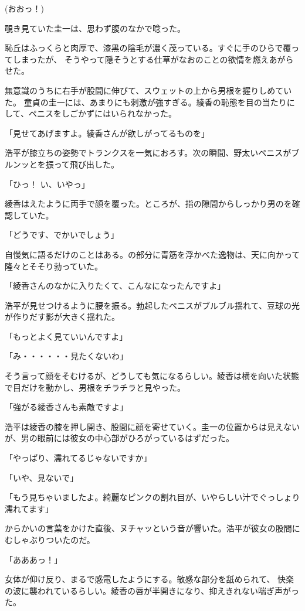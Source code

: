 ﻿\documentclass[book,tate]{jlreq}
\begin{document}
(おおっ！)

覗き見ていた圭一は、思わず腹のなかで唸った。

恥丘はふっくらと肉厚で、漆黒の陰毛が濃く茂っている。すぐに手のひらで覆ってしまったが、
そうやって隠そうとする仕草がなおのことの欲情を燃えあがらせた。

無意識のうちに右手が股間に伸びて、スウェットの上から男根を握りしめていた。
童貞の圭一には、あまりにも刺激が強すぎる。綾香の恥態を目の当たりにして、ペニスをしごかずにはいられなかった。

「見せてあげますよ。綾香さんが欲しがってるものを」

浩平が膝立ちの姿勢でトランクスを一気におろす。次の瞬間、野太いペニスがブルンッとを振って飛び出した。

「ひっ！ い、いやっ」

綾香はえたように両手で顔を覆った。ところが、指の隙間からしっかり男のを確認していた。

「どうです、でかいでしょう」

自慢気に語るだけのことはある。の部分に青筋を浮かべた逸物は、天に向かって隆々とそそり勃っていた。

「綾香さんのなかに入りたくて、こんなになったんですよ」

浩平が見せつけるように腰を振る。勃起したペニスがブルブル揺れて、豆球の光が作りだす影が大きく揺れた。

「もっとよく見ていいんですよ」

「み・・・・・・見たくないわ」

そう言って顔をそむけるが、どうしても気になるらしい。綾香は横を向いた状態で目だけを動かし、男根をチラチラと見やった。

「強がる綾香さんも素敵ですよ」

浩平は綾香の膝を押し開き、股間に顔を寄せていく。圭一の位置からは見えないが、男の眼前には彼女の中心部がひろがっているはずだった。

「やっぱり、濡れてるじゃないですか」

「いや、見ないで」

「もう見ちゃいましたよ。綺麗なピンクの割れ目が、いやらしい汁でぐっしょり濡れてます」

からかいの言葉をかけた直後、ヌチャッという音が響いた。浩平が彼女の股間にむしゃぶりついたのだ。

「あああっ！」

女体が仰け反り、まるで感電したようにする。敏感な部分を舐められて、
快楽の波に襲われているらしい。綾香の唇が半開きになり、抑えきれない喘ぎ声がった。
\end{document}
